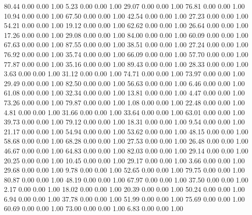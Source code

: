    80.44   0.00   0.00   1.00
    5.23   0.00   0.00   1.00
   29.07   0.00   0.00   1.00
   76.81   0.00   0.00   1.00
   10.94   0.00   0.00   1.00
   67.50   0.00   0.00   1.00
   42.54   0.00   0.00   1.00
   27.23   0.00   0.00   1.00
   54.21   0.00   0.00   1.00
   19.12   0.00   0.00   1.00
   62.62   0.00   0.00   1.00
   26.64   0.00   0.00   1.00
   17.26   0.00   0.00   1.00
   29.08   0.00   0.00   1.00
   84.00   0.00   0.00   1.00
   60.09   0.00   0.00   1.00
   67.63   0.00   0.00   1.00
   87.55   0.00   0.00   1.00
   38.51   0.00   0.00   1.00
   27.24   0.00   0.00   1.00
   76.92   0.00   0.00   1.00
   35.74   0.00   0.00   1.00
   66.09   0.00   0.00   1.00
   57.70   0.00   0.00   1.00
   77.87   0.00   0.00   1.00
   35.16   0.00   0.00   1.00
   89.43   0.00   0.00   1.00
   28.33   0.00   0.00   1.00
    3.63   0.00   0.00   1.00
   31.12   0.00   0.00   1.00
   74.71   0.00   0.00   1.00
   73.97   0.00   0.00   1.00
   29.49   0.00   0.00   1.00
   82.50   0.00   0.00   1.00
   56.63   0.00   0.00   1.00
    6.46   0.00   0.00   1.00
   61.08   0.00   0.00   1.00
   32.34   0.00   0.00   1.00
   13.81   0.00   0.00   1.00
    4.47   0.00   0.00   1.00
   73.26   0.00   0.00   1.00
   79.87   0.00   0.00   1.00
    1.08   0.00   0.00   1.00
   22.48   0.00   0.00   1.00
    4.81   0.00   0.00   1.00
   31.66   0.00   0.00   1.00
   33.64   0.00   0.00   1.00
   63.01   0.00   0.00   1.00
   39.73   0.00   0.00   1.00
   79.12   0.00   0.00   1.00
   18.31   0.00   0.00   1.00
    9.54   0.00   0.00   1.00
   21.17   0.00   0.00   1.00
   54.94   0.00   0.00   1.00
   53.62   0.00   0.00   1.00
   48.15   0.00   0.00   1.00
   58.68   0.00   0.00   1.00
   68.28   0.00   0.00   1.00
   27.53   0.00   0.00   1.00
   26.48   0.00   0.00   1.00
   46.67   0.00   0.00   1.00
   64.83   0.00   0.00   1.00
   82.03   0.00   0.00   1.00
   29.14   0.00   0.00   1.00
   20.25   0.00   0.00   1.00
   10.45   0.00   0.00   1.00
   29.17   0.00   0.00   1.00
    3.66   0.00   0.00   1.00
   29.68   0.00   0.00   1.00
    9.78   0.00   0.00   1.00
   52.65   0.00   0.00   1.00
   79.75   0.00   0.00   1.00
   80.87   0.00   0.00   1.00
   48.19   0.00   0.00   1.00
   67.97   0.00   0.00   1.00
   37.50   0.00   0.00   1.00
    2.17   0.00   0.00   1.00
   18.02   0.00   0.00   1.00
   20.39   0.00   0.00   1.00
   50.24   0.00   0.00   1.00
    6.94   0.00   0.00   1.00
   37.78   0.00   0.00   1.00
   51.99   0.00   0.00   1.00
   75.69   0.00   0.00   1.00
   60.69   0.00   0.00   1.00
   73.00   0.00   0.00   1.00
    6.83   0.00   0.00   1.00
